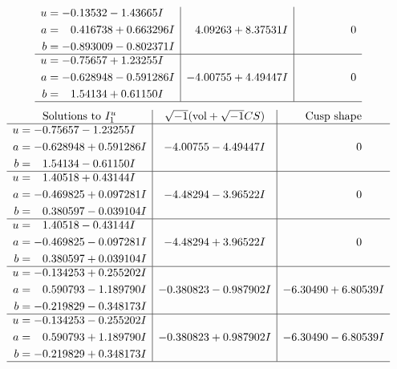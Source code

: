 \documentclass[1p]{elsarticle_modified}
\theoremstyle{definition}
\newcommand{\I}{\sqrt{-1}}
\begin{document}
$$\begin{array}{c|c|c}
\begin{aligned}
u &= -0.13532 - 1.43665 I \\
a &= \phantom{-}0.416738 + 0.663296 I \\
b &= -0.893009 - 0.802371 I\end{aligned}
 & \phantom{-}4.09263 + 8.37531 I & \phantom{-0.000000 } 0 \\ \hline\begin{aligned}
u &= -0.75657 + 1.23255 I \\
a &= -0.628948 - 0.591286 I \\
b &= \phantom{-}1.54134 + 0.61150 I\end{aligned}
 & -4.00755 + 4.49447 I & \phantom{-0.000000 } 0\\
 \hline 
 \end{array}$$\newpage$$\begin{array}{c|c|c}  
\text{Solutions to }I^u_{1}& \I (\text{vol} + \sqrt{-1}CS) & \text{Cusp shape}\\
 \hline 
\begin{aligned}
u &= -0.75657 - 1.23255 I \\
a &= -0.628948 + 0.591286 I \\
b &= \phantom{-}1.54134 - 0.61150 I\end{aligned}
 & -4.00755 - 4.49447 I & \phantom{-0.000000 } 0 \\ \hline\begin{aligned}
u &= \phantom{-}1.40518 + 0.43144 I \\
a &= -0.469825 + 0.097281 I \\
b &= \phantom{-}0.380597 - 0.039104 I\end{aligned}
 & -4.48294 - 3.96522 I & \phantom{-0.000000 } 0 \\ \hline\begin{aligned}
u &= \phantom{-}1.40518 - 0.43144 I \\
a &= -0.469825 - 0.097281 I \\
b &= \phantom{-}0.380597 + 0.039104 I\end{aligned}
 & -4.48294 + 3.96522 I & \phantom{-0.000000 } 0 \\ \hline\begin{aligned}
u &= -0.134253 + 0.255202 I \\
a &= \phantom{-}0.590793 - 1.189790 I \\
b &= -0.219829 - 0.348173 I\end{aligned}
 & -0.380823 - 0.987902 I & -6.30490 + 6.80539 I \\ \hline\begin{aligned}
u &= -0.134253 - 0.255202 I \\
a &= \phantom{-}0.590793 + 1.189790 I \\
b &= -0.219829 + 0.348173 I\end{aligned}
 & -0.380823 + 0.987902 I & -6.30490 - 6.80539 I\\
 \hline 
 \end{array}$$\newpage\newpage\renewcommand{\arraystretch}{1}
\end{document}
